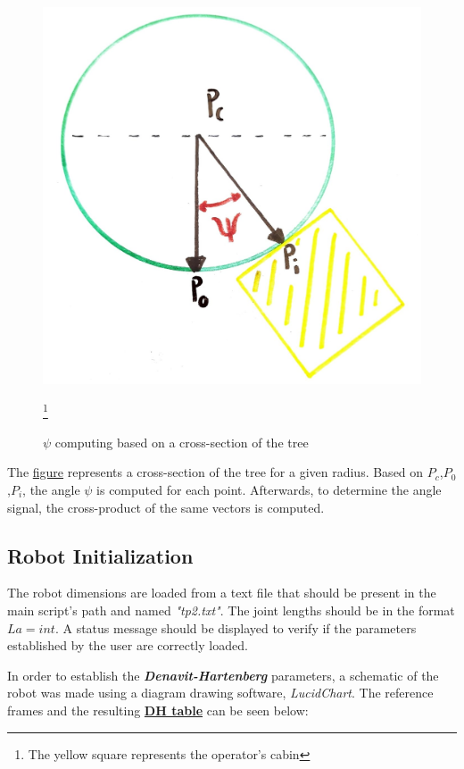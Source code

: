 \documentclass{report}
\begin{document}
\begin{figure}[h]
    \centering
    \includegraphics[scale=0.1]{resources/psi.jpeg}
    \caption{\label{fig:psi}$\psi$ computing based on a cross-section of the
    tree}
\footnote{The yellow square represents the operator's cabin}
\end{figure}

The \hyperref[fig:psi]{figure} represents a cross-section of the tree for a given radius.
Based on $P_c$,$P_0$,$P_i$, the angle $\psi$ is computed for each
point. Afterwards, to determine the angle signal, the cross-product of the same
vectors is computed.

\subsection{Robot Initialization}

The robot dimensions are loaded from a text file that should be present in the
main script's path and named \textit{"tp2.txt"}. The joint lengths should be in
the format $La = int$. A status message should be displayed to verify if the
parameters established by the user are correctly loaded.

In order to establish the \textit{\textbf{Denavit-Hartenberg}} parameters, a
schematic of the robot was made using a diagram drawing
software, \textit{LucidChart}. The reference frames and the resulting \hyperref[tab:dh]{\textbf{DH table}}
can be seen below:
\end{document}
